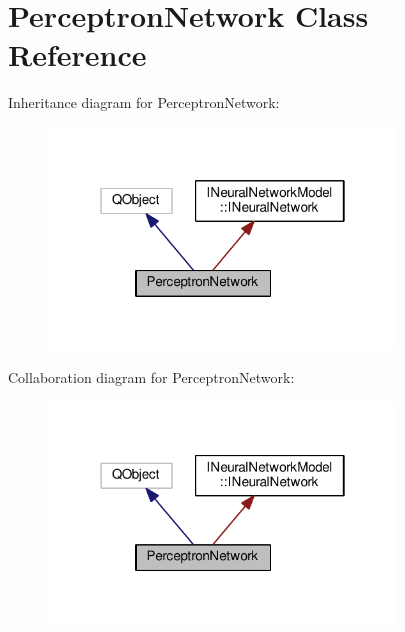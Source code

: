 \hypertarget{class_perceptron_network}{}\section{Perceptron\+Network Class Reference}
\label{class_perceptron_network}


Inheritance diagram for Perceptron\+Network\+:\nopagebreak
\begin{figure}[H]
\begin{center}
\leavevmode
\includegraphics[width=262pt]{class_perceptron_network__inherit__graph}
\end{center}
\end{figure}


Collaboration diagram for Perceptron\+Network\+:\nopagebreak
\begin{figure}[H]
\begin{center}
\leavevmode
\includegraphics[width=262pt]{class_perceptron_network__coll__graph}
\end{center}
\end{figure}

